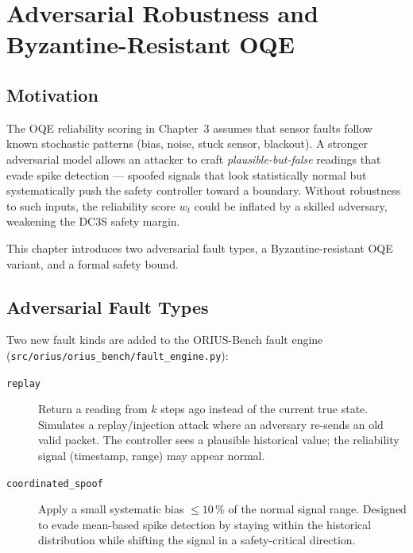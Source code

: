 
\section{Adversarial Robustness and Byzantine-Resistant OQE}
\label{sec:ch22_byzantine_robustness}

\subsection{Motivation}

The OQE reliability scoring in Chapter~3 assumes that sensor faults follow
known stochastic patterns (bias, noise, stuck sensor, blackout).
A stronger adversarial model allows an attacker to craft \emph{plausible-but-false}
readings that evade spike detection — spoofed signals that look statistically
normal but systematically push the safety controller toward a boundary.
Without robustness to such inputs, the reliability score $w_t$ could be
inflated by a skilled adversary, weakening the DC3S safety margin.

This chapter introduces two adversarial fault types, a Byzantine-resistant OQE
variant, and a formal safety bound.

\subsection{Adversarial Fault Types}

Two new fault kinds are added to the ORIUS-Bench fault engine
(\texttt{src/orius/orius\_bench/fault\_engine.py}):

\begin{description}
  \item[\texttt{replay}] Return a reading from $k$ steps ago instead of the
        current true state.  Simulates a replay/injection attack where an
        adversary re-sends an old valid packet.  The controller sees a
        plausible historical value; the reliability signal (timestamp, range)
        may appear normal.
  \item[\texttt{coordinated\_spoof}] Apply a small systematic bias
        $\leq 10\,\%$ of the normal signal range.  Designed to evade
        mean-based spike detection by staying within the historical
        distribution while shifting the signal in a safety-critical direction.
\end{description}

